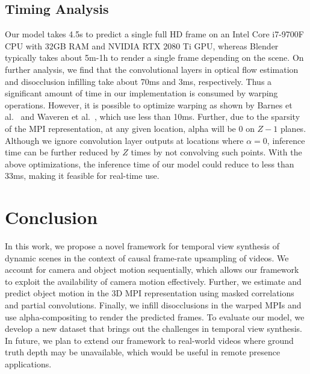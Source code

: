 \documentclass[preprint]{vgtc}
\def\etal{et al.}
\begin{document}
    \subsection{Timing Analysis}\label{subsec:inference-time}
    Our model takes 4.5s to predict a single full HD frame on an Intel Core i7-9700F CPU with 32GB RAM and NVIDIA RTX 2080 Ti GPU, whereas Blender typically takes about 5m-1h to render a single frame depending on the scene.
    On further analysis, we find that the convolutional layers in optical flow estimation and disocclusion infilling take about 70ms and 3ms, respectively.
    Thus a significant amount of time in our implementation is consumed by warping operations.
    However, it is possible to optimize warping as shown by Barnes \etal~\cite{barnes2017positional} and Waveren \etal~\cite{van2016asynchronous}, which use less than 10ms.
    Further, due to the sparsity of the MPI representation, at any given location, alpha will be 0 on $Z-1$ planes.
    Although we ignore convolution layer outputs at locations where $\alpha=0$, inference time can be further reduced by $Z$ times by not convolving such points.
    With the above optimizations, the inference time of our model could reduce to less than 33ms, making it feasible for real-time use.




    \section{Conclusion}\label{sec:conclusion}
    In this work, we propose a novel framework for temporal view synthesis of dynamic scenes in the context of causal frame-rate upsampling of videos.
    We account for camera and object motion sequentially, which allows our framework to exploit the availability of camera motion effectively.
    Further, we estimate and predict object motion in the 3D MPI representation using masked correlations and partial convolutions.
    Finally, we infill disocclusions in the warped MPIs and use alpha-compositing to render the predicted frames.
    To evaluate our model, we develop a new dataset that brings out the challenges in temporal view synthesis.
    In future, we plan to extend our framework to real-world videos where ground truth depth may be unavailable, which would be useful in remote presence applications.



\end{document}
